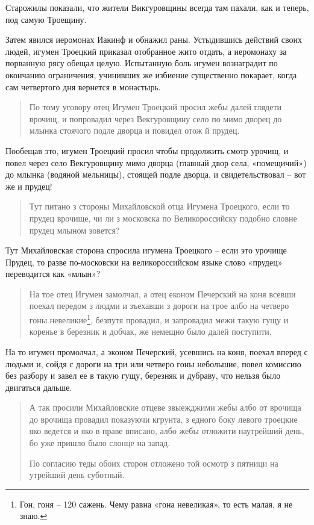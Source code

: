 Старожилы показали, что жители Викгуровщины всегда там пахали, как и теперь, под самую Троещину.

Затем явился иеромонах Иакинф и обнажил раны. Устыдившись действий своих людей, игумен Троецкий приказал отобранное жито отдать, а иеромонаху за порванную рясу обещал целую.  Испытанную боль игумен вознаградит по окончанию ограничения, учинивших же избиение существенно покарает, когда сам четвертого дня вернется в монастырь.

\begin{quotation}
По тому уговору отец Игумен Троецкий просил жебы далей глядети врочищ, и попровадил через Векгуровщину село по мимо дворец до млынка стоячого подле дворца и повидел отож й прудец.
\end{quotation}

Пообещав это, игумен Троецкий просил чтобы продолжить смотр урочищ, и повел через село Векгуровщину мимо дворца (главный двор села, «помещичий») до млынка (водяной мельницы), стоящей подле дворца, и свидетельствовал – вот же и прудец!

\begin{quotation}
Тут питано з стороны Михайловской отца Игумена Троецкого, если то прудец врочище, чи ли з московска по Великороссийску подобно словне прудец млыном зовется?
\end{quotation}

Тут Михайловская сторона спросила игумена Троецкого – если это урочище Прудец, то разве по-московски на великороссийском языке слово «прудец» переводится как «млын»?

\begin{quotation}
На тое отец Игумен замолчал, а отец економ Печерский на коня всевши поехал передом з людми и зъехавши з дороги на трое албо на четверо гоны невеликие\footnote{Гон, гоня – 120 сажень. Чему равна «гона невеликая», то есть малая, я не знаю.}, безпутя провадил, и запровадил межи такую гущу и коренье в березник и добчак, же немещно было далей поступити,
\end{quotation}

На то игумен промолчал, а эконом Печерский, усевшись на коня, поехал вперед с людьми и, сойдя с дороги на три или четверо гоны небольшие, повел комиссию без разбору и завел ее в такую гущу, березняк и дубраву, что нельзя было двигаться дальше.

\begin{quotation}
А так просили Михайловские отцеве звыежджими жебы албо от врочища до врочища провадил показуючи кгрунта, з едного боку левого троецкие яко ведется и яко в праве вписано, албо жебы отложити наутрейший день, бо уже пришло было слонце на запад.

По согласию теды обоих сторон отложено той осмотр з пятници на утрейший день суботный.
\end{quotation}


